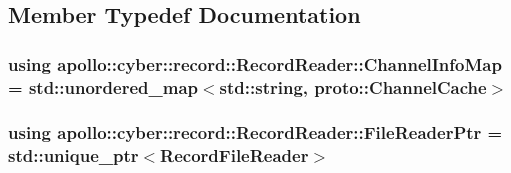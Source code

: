 \subsection{Member Typedef Documentation}
\hypertarget{classapollo_1_1cyber_1_1record_1_1RecordReader_a3eb18b9cfa2630f3e4680e89d4ac50be}{
\subsubsection[{Channel\-Info\-Map}]{\setlength{\rightskip}{0pt plus 5cm}using {\bf apollo\-::cyber\-::record\-::\-Record\-Reader\-::\-Channel\-Info\-Map} =  std\-::unordered\-\_\-map$<$std\-::string, proto\-::\-Channel\-Cache$>$}}\label{classapollo_1_1cyber_1_1record_1_1RecordReader_a3eb18b9cfa2630f3e4680e89d4ac50be}
\hypertarget{classapollo_1_1cyber_1_1record_1_1RecordReader_a99d60a127dc557823804ea7a38f2b337}{
\subsubsection[{File\-Reader\-Ptr}]{\setlength{\rightskip}{0pt plus 5cm}using {\bf apollo\-::cyber\-::record\-::\-Record\-Reader\-::\-File\-Reader\-Ptr} =  std\-::unique\-\_\-ptr$<${\bf Record\-File\-Reader}$>$}}\label{classapollo_1_1cyber_1_1record_1_1RecordReader_a99d60a127dc557823804ea7a38f2b337}


